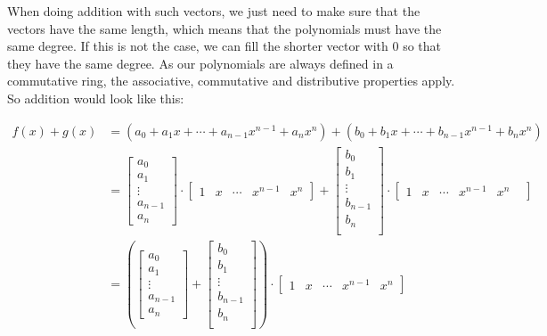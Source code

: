 When doing addition with such vectors, we just need to make sure that the vectors have the same length, which means that the polynomials must have the same degree. If this is not the case, we can fill the shorter vector with 0 so that they have the same degree. As our polynomials are always defined in a commutative  ring, the associative, commutative and distributive properties apply. So addition would look like this:

\begin{align*}
  f(x) + g(x) & = {
  (a_0+ a_1x+\cdots+ a_{n-1}x^{n-1}+a_nx^n)+
  (b_0+ b_1x+\cdots+ b_{n-1}x^{n-1}+b_nx^n)
  }                 \\
              & = {
  \begin{bmatrix}
    a_0     \\
    a_1     \\
    \vdots  \\
    a_{n-1} \\
    a_n
  \end{bmatrix} \cdot
  \begin{bmatrix}
    1       & 
    x       & 
    \cdots  & 
    x^{n-1} & 
    x^n
  \end{bmatrix} + 
  \begin{bmatrix}
    b_0     \\
    b_1     \\
    \vdots  \\
    b_{n-1} \\
    b_n     \\
  \end{bmatrix} \cdot 
  \begin{bmatrix}
    1       & 
    x       & 
    \cdots  & 
    x^{n-1} & 
    x^n     & 
  \end{bmatrix}
  }                 \\
              & = {
  \left (
  \begin{bmatrix}
      a_0     \\
      a_1     \\
      \vdots  \\
      a_{n-1} \\
      a_n
    \end{bmatrix} + 
  \begin{bmatrix}
      b_0     \\
      b_1     \\
      \vdots  \\
      b_{n-1} \\
      b_n     \\
    \end{bmatrix}
  \right ) \cdot 
  \begin{bmatrix}
    1       & 
    x       & 
    \cdots  & 
    x^{n-1} & 
    x^n 
  \end{bmatrix}
  }                 \\
\end{align*}

